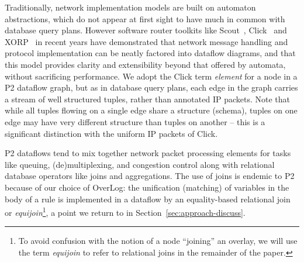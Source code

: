 \documentclass{sig-alt-full}
\def\Sys{P2\xspace}
\def\Lang{OverLog\xspace}
\begin{document}
Traditionally, network implementation models are
built on automaton abstractions, which do not appear at first sight to
have much in common with database query plans.  However software router 
toolkits like Scout~\cite{scout}, Click~\cite{click-tocs} and
XORP~\cite{handley05xorp} in recent
years have demonstrated that network message handling and
protocol implementation can be neatly factored into dataflow diagrams,
and that this model provides clarity and extensibility beyond that
offered by automata, without sacrificing performance. 
We adopt the Click term \textit{element} for a node in a \Sys
dataflow graph, but as in database query plans, each edge in the graph
carries a stream of well structured tuples, rather than annotated IP
packets.  Note that while all tuples flowing on a single edge share a structure
(schema), tuples on one edge may have very different structure than
tuples on another -- this is a significant distinction with the
uniform IP packets of Click.

\Sys dataflows tend to mix together network packet processing elements
for tasks like queuing, (de)multiplexing, and congestion control along
with relational database operators like joins and aggregations.
The use of joins is endemic to
\Sys because of our choice of \Lang: the unification (matching) of
variables in the body of a rule is implemented in a dataflow by an
equality-based relational join or \textit{equijoin}\footnote{To avoid
confusion with the notion of a node ``joining'' an overlay, we will
use the term {\em equijoin} to refer to relational joins in the
remainder of the paper.}, a point we return to in
Section~\ref{sec:approach-discuss}.

% 
% 
\end{document}
